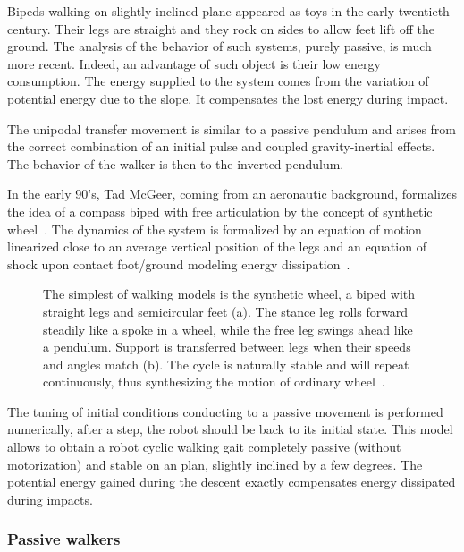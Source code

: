 Bipeds walking on slightly inclined plane appeared as toys in the early twentieth century. Their legs are straight and they rock on sides to allow feet lift off the ground. The analysis of the behavior of such systems, purely passive, is much more recent. Indeed, an advantage of such object is their low energy consumption. The energy supplied to the system comes from the variation of potential energy due to the slope. It compensates the lost energy during impact.

The unipodal transfer movement is similar to a passive pendulum and arises from the correct combination of an initial pulse and coupled gravity-inertial effects. The behavior of the walker is then to the inverted pendulum.

In the early 90's, Tad McGeer, coming from an aeronautic background, formalizes the idea of a compass biped with free articulation by the concept of synthetic wheel~\cite{mcgeer1990passive}.
The dynamics of the system is formalized by an equation of motion linearized close to an average vertical position of the legs and an equation of shock upon contact foot/ground modeling energy dissipation~\cite{mcgeer1992principles}.

\begin{figure}[h]
\centering
    \hfil
    \caption{The simplest of walking models is the synthetic wheel, a biped with straight legs and semicircular feet (a). The stance leg rolls forward steadily like a spoke in a wheel, while the free leg swings ahead like a pendulum. Support is transferred between legs when their speeds and angles match (b). The cycle is naturally stable and will repeat continuously, thus synthesizing the motion of ordinary wheel~\cite{mcgeer1992principles}.}
    \label{fig:synthetic-wheel}
\end{figure}


The tuning of initial conditions conducting to a passive movement is performed numerically, after a step, the robot should be back to its initial state. This model allows to obtain a robot cyclic walking gait completely passive (without motorization) and stable on an plan, slightly inclined by a few degrees. The potential energy gained during the descent exactly compensates energy dissipated during impacts.


\subsubsection{Passive walkers} %

